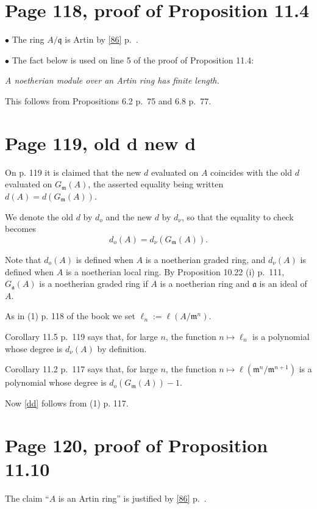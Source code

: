 \documentclass[parskip=half]{scrartcl}%
\newcommand{\mf}{\mathfrak}
\newcommand{\bu}{\bullet}
\begin{document}
\section{Page 118, proof of Proposition 11.4}%

$\bu$ The ring $A/\mf q$ is Artin by \eqref{86} p.~\pageref{86}.

$\bu$ The fact below is used on line 5 of the proof of Proposition 11.4:

\emph{A noetherian module over an Artin ring has finite length.}

This follows from Propositions 6.2 p.~75 and 6.8 p.~77.

\section{Page 119, old d new d}\label{odnd}%

On p. 119 it is claimed that the new $d$ evaluated on $A$ coincides with the old $d$ evaluated on $G_{\mf m}(A)$, the asserted equality being written $d(A)=d(G_{\mf m}(A))$. 

We denote the old $d$ by $d_o$ and the new $d$ by $d_\nu$, so that the equality to check becomes 
\begin{equation}\label{dd}
d_o(A)=d_\nu(G_{\mf m}(A)).
\end{equation}

Note that $d_o(A)$ is defined when $A$ is a noetherian graded ring, and $d_\nu(A)$ is defined when $A$ is a noetherian local ring. By Proposition 10.22 (i) p.~111, $G_{\mf a}(A)$ is a noetherian graded ring if $A$ is a noetherian ring and $\mf a$ is an ideal of $A$.

As in (1) p. 118 of the book we set $\ell_n:=\ell(A/\mf m^n)$. 

Corollary 11.5 p.~119 says that, for large $n$, the function $n\mapsto\ell_n$ is a polynomial whose degree is $d_\nu(A)$ by definition. 

Corollary 11.2 p.~117 says that, for large $n$, the function $n\mapsto\ell(\mf m^n/\mf m^{n+1})$ is a polynomial whose degree is $d_o(G_{\mf m}(A))-1$.

Now \eqref{dd} follows from (1) p. 117.

\section{Page 120, proof of Proposition 11.10}%

The claim ``$A$ is an Artin ring'' is justified by \eqref{86} p.~\pageref{86}.
\end{document}

